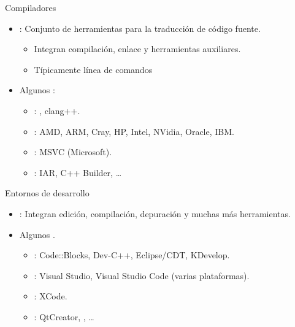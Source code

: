 \begin{frame}[t]{Compiladores}
  \begin{itemize}
    \item {}: Conjunto de herramientas para la traducción
          de código fuente.
      \begin{itemize}
        \item Integran compilación, enlace y herramientas auxiliares.
        \item Típicamente línea de comandos
      \end{itemize}

  \item Algunos :
    \begin{itemize}
      \item {}: , clang++.
      \item {}: AMD, ARM, Cray, HP, Intel, NVidia, Oracle, IBM.
      \item {}: MSVC (Microsoft).
      \item {}: IAR, C++ Builder, \ldots
    \end{itemize}
  \end{itemize}
\end{frame}

\begin{frame}[t]{Entornos de desarrollo}
\begin{itemize}
  \item {}: Integran edición, compilación, depuración
        y muchas más herramientas.

  \item Algunos .
    \begin{itemize}
      \item {}: Code::Blocks, Dev-C++, Eclipse/CDT, KDevelop.
      \item {}: Visual Studio, Visual Studio Code (varias plataformas).
      \item {}: XCode.
      \item {}: QtCreator, , \ldots
    \end{itemize}
\end{itemize}
\end{frame}
